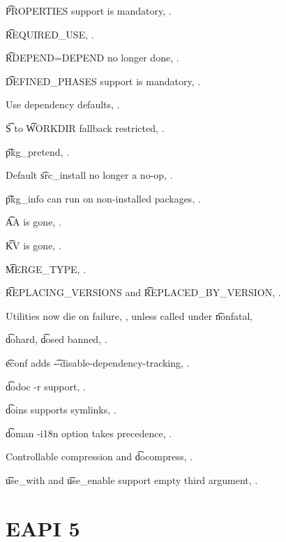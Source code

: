 \begin{compactitem}
\item \t{PROPERTIES} support is mandatory, .
\item \t{REQUIRED_USE}, .
\item \t{RDEPEND=DEPEND} no longer done, .
\item \t{DEFINED_PHASES} support is mandatory, .
\item Use dependency defaults, .
\item \t{S} to \t{WORKDIR} fallback restricted, .
\item \t{pkg_pretend}, .
\item Default \t{src_install} no longer a no-op, .
\item \t{pkg_info} can run on non-installed packages, .
\item \t{AA} is gone, .
\item \t{KV} is gone, .
\item \t{MERGE_TYPE}, .
\item \t{REPLACING_VERSIONS} and \t{REPLACED_BY_VERSION}, .
\item Utilities now die on failure, , unless called under \t{nonfatal},
\item \t{dohard}, \t{dosed} banned, .
\item \t{econf} adds \t{-{}-disable-dependency-tracking}, .
\item \t{dodoc -r} support, .
\item \t{doins} supports symlinks, .
\item \t{doman -i18n} option takes precedence, .
\item Controllable compression and \t{docompress}, .
\item \t{use_with} and \t{use_enable} support empty third argument, .
\end{compactitem}

\section{EAPI 5}

